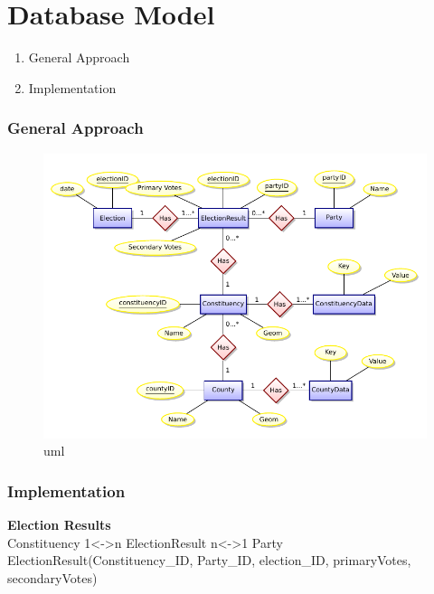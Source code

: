 
\section{Database Model}

\begin{enumerate}
\def\labelenumi{\arabic{enumi}.}
\itemsep1pt\parskip0pt
\item
  General Approach
\item
  Implementation
\end{enumerate}

\subsubsection{General Approach}\label{general-approach}

\begin{figure}[htbp]
\centering
\includegraphics[width=1.1\textwidth]{../img/KIQu2J3.png}
\caption{uml}
\end{figure}

\subsubsection{Implementation}\label{implementation}

\textbf{Election Results}
\\Constituency 1\textless{}-\textgreater{}n
ElectionResult n\textless{}-\textgreater{}1
Party
\\ElectionResult(Constituency\_ID, Party\_ID, election\_ID,
primaryVotes, secondaryVotes)



